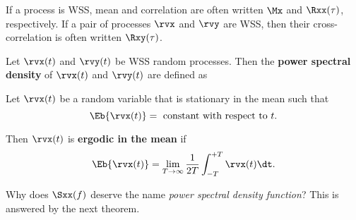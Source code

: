If a process is WSS, mean and correlation are often written
$\Mx$ and $\Rxx(\tau)$, respectively.
If a pair of processes $\rvx$ and $\rvy$ are WSS,
then their cross-correlation is often written $\Rxy(\tau)$.

\begin{definition}
\label{def:psd}
Let $\rvx(t)$ and $\rvy(t)$ be WSS random processes.
Then the \textbf{power spectral density} of $\rvx(t)$ and $\rvy(t)$ are defined as
\end{definition}


\begin{definition}
Let $\rvx(t)$ be a random variable that is stationary in the mean such that
\[ \Eb{\rvx(t)} = \mbox{ constant with respect to } t.\]

Then $\rvx(t)$ is \textbf{ergodic in the mean} if
\[ \Eb{\rvx(t)} = \lim_{T\to\infty}\frac{1}{2T}\int_{-T}^{+T}\rvx(t)\dt.\]
\end{definition}

Why does $\Sxx(f)$ deserve the name {\em power spectral density function}?
This is answered by the next theorem.


